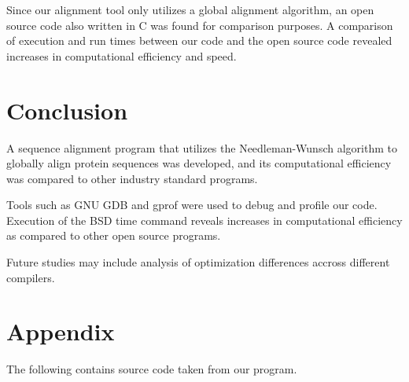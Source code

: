 \documentclass{article}
\begin{document}
Since our alignment tool only utilizes a global alignment algorithm, an open
source code also written in C was found for comparison purposes.
A comparison of execution and run times between our code and the open source
code revealed increases in computational efficiency and speed.

\section*{Conclusion}
A sequence alignment program that utilizes the Needleman-Wunsch algorithm to
globally align protein sequences was developed, and its
computational efficiency was compared to other industry standard programs.
 
Tools such as GNU GDB and gprof were used to debug and profile our code.
Execution of the BSD time command reveals increases in computational efficiency
as compared to other open source programs.

Future studies may include analysis of optimization differences accross
different compilers.

\newpage
\section*{Appendix}
The following contains source code taken from our program.
\end{document}
